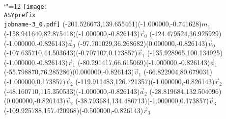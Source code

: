 \setlength{\unitlength}{1pt}
\makeatletter%
\let\ASYencoding\f@encoding%
\let\ASYfamily\f@family%
\let\ASYseries\f@series%
\let\ASYshape\f@shape%
\makeatother%
{\catcode`"=12%
\texttt{[image: \\ASYprefix\\jobname-3\_0.pdf]}%
}%
\color{ASYcolor}
\fontsize{12.000000}{14.400000}\selectfont
\usefont{\ASYencoding}{\ASYfamily}{\ASYseries}{\ASYshape}%
\ASYalign(-201.526673,139.655461)(-1.000000,-0.741628){$m_1$}%
\color{ASYcolor}
\fontsize{12.000000}{14.400000}\selectfont
\ASYalign(-158.941640,82.875418)(-1.000000,-0.826143){$\vec{r}_0$}%
\color{ASYcolor}
\fontsize{12.000000}{14.400000}\selectfont
\ASYalign(-124.479524,36.925929)(-1.000000,-0.826143){$\vec{a}_0$}%
\color{ASYcolor}
\fontsize{12.000000}{14.400000}\selectfont
\ASYalign(-97.701029,36.268682)(0.000000,-0.826143){$\vec{v}_0$}%
\color{ASYcolor}
\fontsize{12.000000}{14.400000}\selectfont
\ASYalign(-107.635710,44.503643)(-0.707107,0.173857){$\vec{v}_1$}%
\color{ASYcolor}
\fontsize{12.000000}{14.400000}\selectfont
\ASYalign(-135.928965,100.134925)(-1.000000,-0.826143){$\vec{r}_1$}%
\color{ASYcolor}
\fontsize{12.000000}{14.400000}\selectfont
\ASYalign(-80.291417,66.615069)(-1.000000,-0.826143){$\vec{a}_1$}%
\color{ASYcolor}
\fontsize{12.000000}{14.400000}\selectfont
\ASYalign(-55.798870,76.285286)(0.000000,-0.826143){$\vec{v}_1$}%
\color{ASYcolor}
\fontsize{12.000000}{14.400000}\selectfont
\ASYalign(-66.822904,80.679031)(-1.000000,0.173857){$\vec{v}_2$}%
\color{ASYcolor}
\fontsize{12.000000}{14.400000}\selectfont
\ASYalign(-119.911483,126.721357)(-1.000000,-0.826143){$\vec{r}_2$}%
\color{ASYcolor}
\fontsize{12.000000}{14.400000}\selectfont
\ASYalign(-48.160710,115.350533)(-1.000000,-0.826143){$\vec{a}_2$}%
\color{ASYcolor}
\fontsize{12.000000}{14.400000}\selectfont
\ASYalign(-28.819684,132.504096)(0.000000,-0.826143){$\vec{v}_2$}%
\color{ASYcolor}
\fontsize{12.000000}{14.400000}\selectfont
\ASYalign(-38.793684,134.486713)(-1.000000,0.173857){$\vec{v}_3$}%
\color{ASYcolor}
\fontsize{12.000000}{14.400000}\selectfont
\ASYalign(-109.925788,157.420968)(-0.500000,-0.826143){$\vec{r}_3$}%
